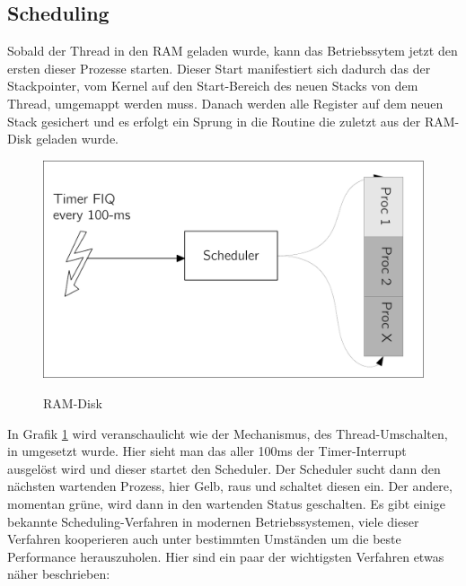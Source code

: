 \subsection{Scheduling}
Sobald der Thread in den RAM geladen wurde, kann das Betriebssytem jetzt den ersten dieser Prozesse starten. Dieser Start manifestiert sich dadurch das der Stackpointer, vom Kernel auf den Start-Bereich des neuen Stacks von dem Thread, umgemappt werden muss. Danach werden alle Register auf dem neuen Stack gesichert und es erfolgt ein Sprung in die Routine die zuletzt aus der RAM-Disk geladen wurde. 
\begin{figure}[H]
	\begin{center}	
	\caption{RAM-Disk}
	\includegraphics[scale=0.60]{common/scheduler.pdf}
	\label{scheduler}
	\end{center}
\end{figure}
\noindent
In Grafik \ref{scheduler} wird veranschaulicht wie der Mechanismus, des Thread-Umschalten, in \mops umgesetzt wurde. Hier sieht man das aller 100ms der Timer-Interrupt ausgel\"ost wird und dieser startet den Scheduler. Der Scheduler sucht dann den n\"achsten wartenden Prozess, hier Gelb, raus und schaltet diesen ein. Der andere, momentan gr\"une, wird dann in den wartenden Status geschalten.
Es gibt einige bekannte Scheduling-Verfahren in modernen Betriebssystemen, viele dieser Verfahren kooperieren auch unter bestimmten Umst\"anden um die beste Performance herauszuholen. Hier sind ein paar der wichtigsten Verfahren etwas n\"aher beschrieben:
